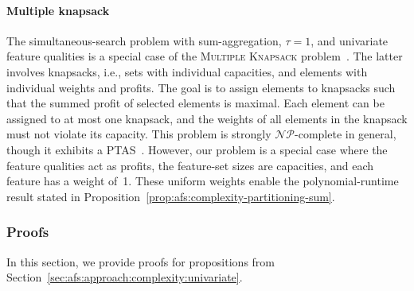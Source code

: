 \documentclass{article}
\theoremstyle{definition}
\begin{document}
\paragraph{Multiple knapsack}

The simultaneous-search problem with sum-aggregation, $\tau=1$, and univariate feature qualities is a special case of the \textsc{Multiple Knapsack} problem~\cite{chekuri2005polynomial}.
The latter involves knapsacks, i.e., sets with individual capacities, and elements with individual weights and profits.
The goal is to assign elements to knapsacks such that the summed profit of selected elements is maximal.
Each element can be assigned to at most one knapsack, and the weights of all elements in the knapsack must not violate its capacity.
This problem is strongly $\mathcal{NP}$-complete in general, though it exhibits a PTAS~\cite{chekuri2005polynomial}.
However, our problem is a special case where the feature qualities act as profits, the feature-set sizes are capacities, and each feature has a weight of~1.
These uniform weights enable the polynomial-runtime result stated in Proposition~\ref{prop:afs:complexity-partitioning-sum}.

\subsubsection{Proofs}
\label{sec:afs:appendix:complexity:proofs}

In this section, we provide proofs for propositions from Section~\ref{sec:afs:approach:complexity:univariate}.
\end{document}
